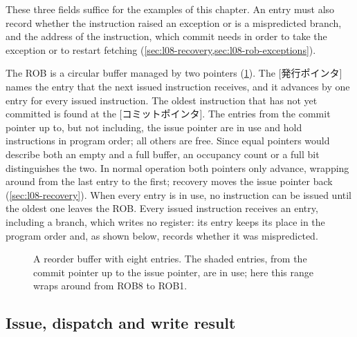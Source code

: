 \documentclass[../main.tex]{subfiles}
\begin{document}
These three fields suffice for the examples of this chapter.  An entry must also record whether
the instruction raised an exception or is a mispredicted branch, and the
address of the instruction, which commit needs in order to take the exception
or to restart fetching (\cref{sec:l08-recovery,sec:l08-rob-exceptions}).

The ROB is a circular buffer managed by two pointers
(\cref{fig:l08-rob}).  The [発行ポインタ] names the entry
that the next issued instruction receives, and it advances by one entry for
every issued instruction.  The oldest instruction that has not yet committed
is found at the [コミットポインタ].  The entries from the
commit pointer up to, but not including, the issue pointer are in use and hold
instructions in program order; all others are free.  Since equal pointers
would describe both an empty and a full buffer, an occupancy count or a full
bit distinguishes the two.  In normal operation both pointers only advance,
wrapping around from the last entry to the first; recovery moves the issue
pointer back (\cref{sec:l08-recovery}).  When every entry is in use, no
instruction can be issued until the oldest one leaves the ROB.  Every issued
instruction receives an entry, including a branch, which writes no register:
its entry keeps its place in the program order and, as shown below, records
whether it was mispredicted.

\begin{figure}[htbp]
  \centering
  
  \caption{A reorder buffer with eight entries.  The shaded entries, from the
    commit pointer up to the issue pointer, are in use; here this range wraps
    around from ROB8 to ROB1.}
  \label{fig:l08-rob}
\end{figure}

\subsection{Issue, dispatch and write result}
\end{document}

